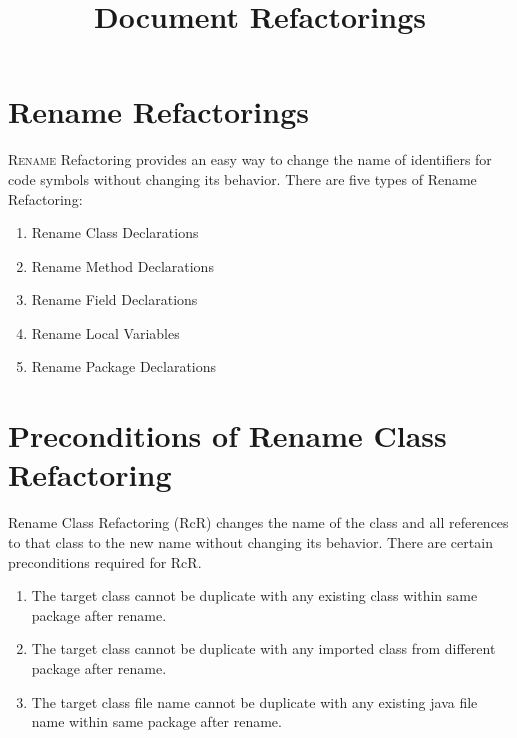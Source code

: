\documentclass[10pt,conference]{IEEEtran}
\begin{document}
\title{Document Refactorings}

\author{
\and
{}
\and
{}
}

\maketitle

\section{\textbf{Rename Refactorings}}
\lettrine{R} {ename} Refactoring provides an easy way to change the name of identifiers for code symbols without changing its behavior.
There are five types of Rename Refactoring: 
\begin{enumerate}
	\item Rename Class Declarations 
	\item Rename Method Declarations  
	\item Rename Field Declarations  
	\item Rename Local Variables  
	\item Rename Package Declarations
\end{enumerate}

\section{\textbf{Preconditions of Rename Class Refactoring}}
Rename Class Refactoring (RcR) changes the name of the class and all references to that class to the new name without changing its behavior. There are certain preconditions required for RcR. 
\begin{enumerate}
	\item The target class cannot be duplicate with any existing class within same package after rename.
	\item The target class cannot be duplicate with any imported class from different package after rename.
	\item The target class file name cannot be duplicate with any existing java file name within same package after rename.
\end{enumerate}

\label{sec:precon1}
	
\label{sec:precon2}

\label{sec:precon3}



\end{document}
